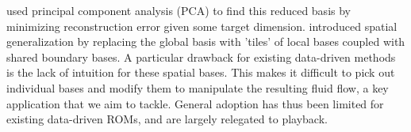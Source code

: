 \citet{treuille2006model} used principal component analysis (PCA) to find this reduced basis by minimizing reconstruction error given some target dimension. 
\citet{wicke2009modular} introduced spatial generalization by replacing the global basis with 'tiles' of local bases coupled with shared boundary bases.
A particular drawback for existing data-driven methods is the lack of intuition for these spatial bases. 
This makes it difficult to pick out individual bases and modify them to manipulate the resulting fluid flow, a key application that we aim to tackle.
General adoption has thus been limited for existing data-driven ROMs, and are largely relegated to playback. 





